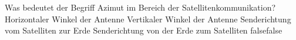     {Was bedeutet der Begriff Azimut im Bereich der Satellitenkommunikation?}
    {Horizontaler Winkel der Antenne}
    {Vertikaler Winkel der Antenne}
    {Senderichtung vom Satelliten zur Erde}
    {Senderichtung von der Erde zum Satelliten}
    {false}{false}